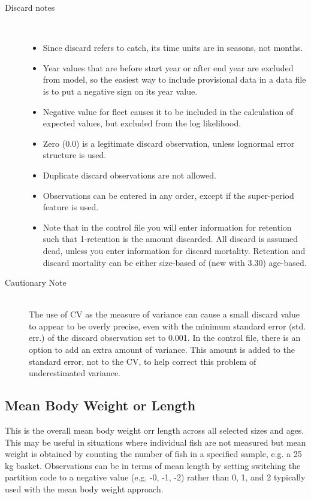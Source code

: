 \begin{description}
\begin{itemize}
	\end{itemize}
	\item[Discard notes]\
	\begin{itemize}
		\item Since discard refers to catch, its time units are in seasons, not months.
		\item Year values that are before start year or after end year are excluded from model, so the easiest way to include provisional data in a data file is to put a negative sign on its year value.
		\item Negative value for fleet causes it to be included in the calculation of expected values, but excluded from the log likelihood.
		\item Zero (0.0) is a legitimate discard observation, unless lognormal error structure is used.
		\item Duplicate discard observations are not allowed.
		\item Observations can be entered in any order, except if the super-period feature is used. 
		\item Note that in the control file you will enter information for retention such that 1-retention is the amount discarded.  All discard is assumed dead, unless you enter information for discard mortality.  Retention and discard mortality can be either size-based of (new with 3.30) age-based.
	\end{itemize}
	\item[Cautionary Note]\hfill\\
	The use of CV as the measure of variance can cause a small discard value to appear to be overly precise, even with the minimum standard error (std. err.) of the discard observation set to 0.001.  In the control file, there is an option to add an extra amount of variance.  This amount is added to the standard error, not to the CV, to help correct this problem of underestimated variance.
\end{description}

\subsection{Mean Body Weight or Length}
This is the overall mean body weight orr length across all selected sizes and ages.  This may be useful in situations where individual fish are not measured but mean weight is obtained by counting the number of fish in a specified sample, e.g. a 25 kg basket.  Observations can be  in terms of mean length by setting switching the partition code to a negative value (e.g. -0, -1, -2) rather than 0, 1, and 2 typically used with the mean body weight approach.

